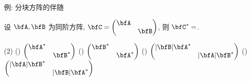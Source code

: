 \begin{frame}{例: 分块方阵的伴随}
	\onslide<+->
	\begin{exercise}
		设 $\bfA,\bfB$ 为同阶方阵, $\bfC=\begin{pmatrix}
			\bfA&\\ &\bfB
		\end{pmatrix}$,
		则 $\bfC^*=$.
		\begin{taskschoice}(2)
			() $\begin{pmatrix}\bfA^*&\\&\bfB^*\end{pmatrix}$
			() $\begin{pmatrix}\bfB^*&\\&\bfA^*\end{pmatrix}$
			() $\begin{pmatrix}|\bfB|\bfA^*&\\&|\bfA|\bfB^*\end{pmatrix}$
			() $\begin{pmatrix}|\bfA|\bfB^*&\\&|\bfB|\bfA^*\end{pmatrix}$
		\end{taskschoice}
	\end{exercise}
\end{frame}

